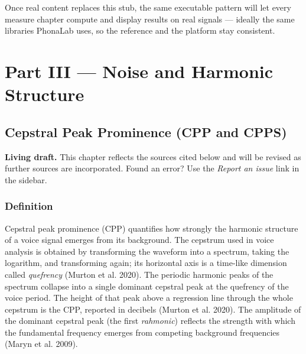 \documentclass[
  english,
  letterpaper,
]{scrbook}
\begin{document}
Once real content replaces this stub, the same executable pattern will
let every measure chapter compute and display results on real signals
--- ideally the same libraries PhonaLab uses, so the reference and the
platform stay consistent.

\part{Part III --- Noise and Harmonic Structure}

\chapter{Cepstral Peak Prominence (CPP and
CPPS)}\label{cepstral-peak-prominence-cpp-and-cpps}

\begin{tcolorbox}[enhanced jigsaw, arc=.35mm, bottomrule=.15mm, bottomtitle=1mm, breakable, colback=white, colbacktitle=quarto-callout-note-color!10!white, colframe=quarto-callout-note-color-frame, coltitle=black, left=2mm, leftrule=.75mm, opacityback=0, opacitybacktitle=0.6, rightrule=.15mm, title=\textcolor{quarto-callout-note-color}{\faInfo}\hspace{0.5em}{Note}, titlerule=0mm, toprule=.15mm, toptitle=1mm]

\textbf{Living draft.} This chapter reflects the sources cited below and
will be revised as further sources are incorporated. Found an error? Use
the \emph{Report an issue} link in the sidebar.

\end{tcolorbox}

\section{Definition}\label{definition}

Cepstral peak prominence (CPP) quantifies how strongly the harmonic
structure of a voice signal emerges from its background. The cepstrum
used in voice analysis is obtained by transforming the waveform into a
spectrum, taking the logarithm, and transforming again; its horizontal
axis is a time-like dimension called \emph{quefrency} (Murton et al.
2020). The periodic harmonic peaks of the spectrum collapse into a
single dominant cepstral peak at the quefrency of the voice period. The
height of that peak above a regression line through the whole cepstrum
is the CPP, reported in decibels (Murton et al. 2020). The amplitude of
the dominant cepstral peak (the first \emph{rahmonic}) reflects the
strength with which the fundamental frequency emerges from competing
background frequencies (Maryn et al. 2009).
\end{document}
